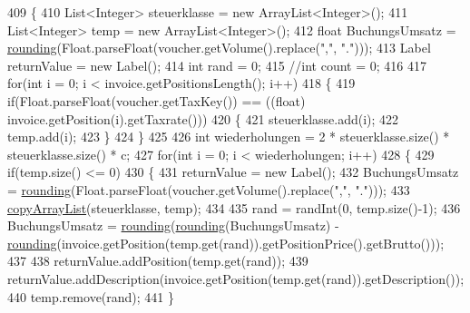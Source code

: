 \begin{DoxyCode}
409     \{
410         List<Integer> steuerklasse = \textcolor{keyword}{new} ArrayList<Integer>();
411         List<Integer> temp = \textcolor{keyword}{new} ArrayList<Integer>();
412         \textcolor{keywordtype}{float} BuchungsUmsatz = \hyperlink{class_booking_1_1_c_s_v_booking_handler_acbde555759b0d5d7b8dd07b6da253083}{rounding}(Float.parseFloat(voucher.getVolume().replace(\textcolor{stringliteral}{","}, \textcolor{stringliteral}{"."})));
413         Label returnValue = \textcolor{keyword}{new} Label();
414         \textcolor{keywordtype}{int} rand = 0;
415         \textcolor{comment}{//int count = 0;}
416         
417         \textcolor{keywordflow}{for}(\textcolor{keywordtype}{int} i = 0; i < invoice.getPositionsLength(); i++)
418         \{
419             \textcolor{keywordflow}{if}(Float.parseFloat(voucher.getTaxKey()) == ((\textcolor{keywordtype}{float}) invoice.getPosition(i).getTaxrate()))
420             \{
421                 steuerklasse.add(i);
422                 temp.add(i);
423             \}
424         \}
425         
426         \textcolor{keywordtype}{int} wiederholungen = 2 * steuerklasse.size() * steuerklasse.size() * c;
427         \textcolor{keywordflow}{for}(\textcolor{keywordtype}{int} i = 0; i < wiederholungen; i++)
428         \{
429             \textcolor{keywordflow}{if}(temp.size() <= 0)
430             \{
431                 returnValue = \textcolor{keyword}{new} Label();
432                 BuchungsUmsatz = \hyperlink{class_booking_1_1_c_s_v_booking_handler_acbde555759b0d5d7b8dd07b6da253083}{rounding}(Float.parseFloat(voucher.getVolume().replace(\textcolor{stringliteral}{","}, \textcolor{stringliteral}{"."})));
433                 \hyperlink{class_booking_1_1_c_s_v_booking_handler_afdcd7e2d786948b378e23ea65dce0be2}{copyArrayList}(steuerklasse, temp);
434                 
435                 rand = randInt(0, temp.size()-1);
436                 BuchungsUmsatz = \hyperlink{class_booking_1_1_c_s_v_booking_handler_acbde555759b0d5d7b8dd07b6da253083}{rounding}(\hyperlink{class_booking_1_1_c_s_v_booking_handler_acbde555759b0d5d7b8dd07b6da253083}{rounding}(BuchungsUmsatz) - 
      \hyperlink{class_booking_1_1_c_s_v_booking_handler_acbde555759b0d5d7b8dd07b6da253083}{rounding}(invoice.getPosition(temp.get(rand)).getPositionPrice().getBrutto()));
437                 
438                 returnValue.addPosition(temp.get(rand));
439                 returnValue.addDescription(invoice.getPosition(temp.get(rand)).getDescription());
440                 temp.remove(rand);
441             \}

\end{DoxyCode}
